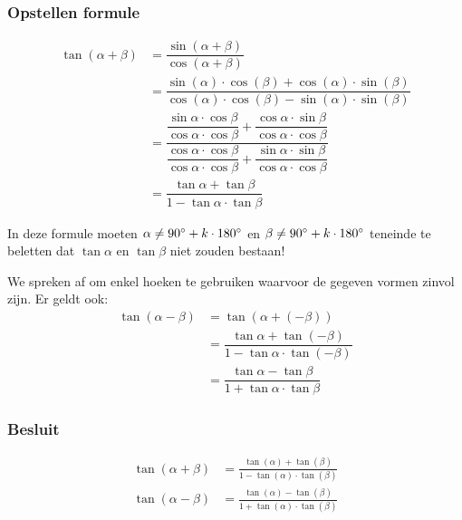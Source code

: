 \documentclass[twoside,a4paper,12pt]{article}
\begin{document}
\subsubsection*{Opstellen formule}
\begin{align*}
  \tan(\alpha + \beta) &= \dfrac{\sin(\alpha + \beta)}{\cos(\alpha+\beta)}\\
                       &= \dfrac{\sin(\alpha)\cdot \cos(\beta)+\cos(\alpha)\cdot \sin(\beta)}{\cos(\alpha)\cdot \cos(\beta)-\sin(\alpha)\cdot \sin(\beta)}\\
                       &= \dfrac{\dfrac{\sin\alpha\cdot\cos\beta}{\cos\alpha\cdot\cos\beta}+\dfrac{\cos\alpha\cdot\sin\beta}{\cos\alpha\cdot\cos\beta}}{\dfrac{\cos\alpha\cdot\cos\beta}{\cos\alpha\cdot\cos\beta}+\dfrac{\sin\alpha\cdot\sin\beta}{\cos\alpha\cdot\cos\beta}}\\
                       &= \dfrac{\tan\alpha+\tan\beta}{1-\tan\alpha\cdot\tan\beta}
\end{align*}

In deze formule moeten $\alpha\neq 90^\circ + k\cdot 180^\circ$ en $\beta \neq 90^\circ + k\cdot 180^\circ$ teneinde te beletten dat $\tan\alpha$ en $\tan\beta$ niet zouden bestaan!

We spreken af om enkel hoeken te gebruiken waarvoor de gegeven vormen zinvol zijn. Er geldt ook:
\begin{align*}
  \tan(\alpha - \beta) &= \tan(\alpha + (-\beta))\\
                       &= \dfrac{\tan\alpha + \tan(-\beta)}{1-\tan\alpha\cdot\tan(-\beta)}\\
                       &= \dfrac{\tan\alpha - \tan\beta}{1+\tan\alpha\cdot\tan\beta}
\end{align*}

\subsubsection*{Besluit}
\begin{align*}
  \tan(\alpha + \beta)&=\frac{\tan(\alpha)+\tan(\beta)}{1-\tan(\alpha)\cdot\tan(\beta)}\\
  \tan(\alpha - \beta)&=\frac{\tan(\alpha)-\tan(\beta)}{1+\tan(\alpha)\cdot\tan(\beta)}
\end{align*}
\end{document}
